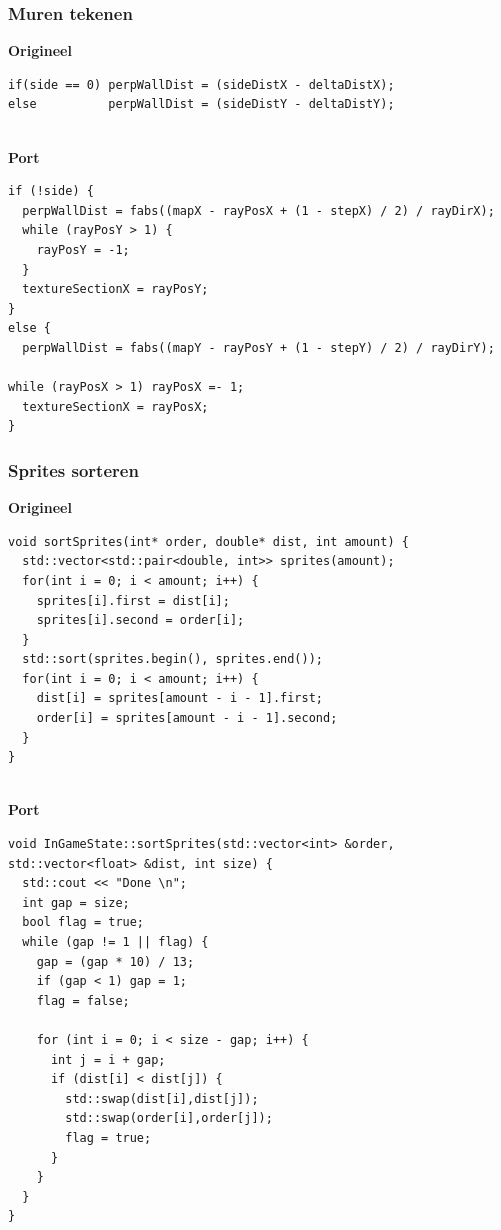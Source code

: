 \documentclass{report}
\begin{document}
      \subsubsection{Muren tekenen} %
      \label{ssub:textures_laden}

\textbf{Origineel}
\begin{verbatim}
if(side == 0) perpWallDist = (sideDistX - deltaDistX);
else          perpWallDist = (sideDistY - deltaDistY);
\end{verbatim}
\\
\textbf{Port}
\begin{verbatim}
if (!side) {
  perpWallDist = fabs((mapX - rayPosX + (1 - stepX) / 2) / rayDirX);
  while (rayPosY > 1) {
    rayPosY = -1;
  }
  textureSectionX = rayPosY;
}
else {
  perpWallDist = fabs((mapY - rayPosY + (1 - stepY) / 2) / rayDirY);

while (rayPosX > 1) rayPosX =- 1;
  textureSectionX = rayPosX;
}
\end{verbatim}
\newpage
      \subsubsection{Sprites sorteren} %
      \label{ssub:sprites_sorteren}
\textbf{Origineel}
\begin{verbatim}
void sortSprites(int* order, double* dist, int amount) {
  std::vector<std::pair<double, int>> sprites(amount);
  for(int i = 0; i < amount; i++) {
    sprites[i].first = dist[i];
    sprites[i].second = order[i];
  }
  std::sort(sprites.begin(), sprites.end());
  for(int i = 0; i < amount; i++) {
    dist[i] = sprites[amount - i - 1].first;
    order[i] = sprites[amount - i - 1].second;
  }
}
\end{verbatim}
\\
\textbf{Port}
\begin{verbatim}
void InGameState::sortSprites(std::vector<int> &order, std::vector<float> &dist, int size) {
  std::cout << "Done \n";
  int gap = size;
  bool flag = true;
  while (gap != 1 || flag) {
    gap = (gap * 10) / 13;
    if (gap < 1) gap = 1;
    flag = false;

    for (int i = 0; i < size - gap; i++) {
      int j = i + gap;
      if (dist[i] < dist[j]) {
        std::swap(dist[i],dist[j]);
        std::swap(order[i],order[j]);
        flag = true;
      }
    }
  }
}
\end{verbatim}
\end{document}
